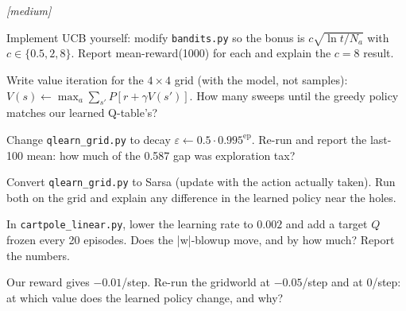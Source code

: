 \emph{[medium]}
\begin{exercise}
Implement UCB yourself: modify \texttt{bandits.py} so the bonus is
$c\sqrt{\ln t / N_a}$ with $c \in \{0.5, 2, 8\}$. Report
mean-reward(1000) for each and explain the $c{=}8$ result.
\end{exercise}
\begin{exercise}
Write value iteration for the $4\times4$ grid (with the model, not
samples): $V(s) \leftarrow \max_a \sum_{s'} P[r+\gamma V(s')]$.
How many sweeps until the greedy policy matches our learned Q-table's?
\end{exercise}
\begin{exercise}
Change \texttt{qlearn\_grid.py} to decay
$\varepsilon \leftarrow 0.5 \cdot 0.995^{\mathrm{ep}}$. Re-run and
report the last-100 mean: how much of the 0.587 gap was exploration
tax?
\end{exercise}
\begin{exercise}
Convert \texttt{qlearn\_grid.py} to Sarsa (update with the action
actually taken). Run both on the grid and explain any difference in
the learned policy near the holes.
\end{exercise}
\begin{exercise}
In \texttt{cartpole\_linear.py}, lower the learning rate to
$0.002$ and add a target $Q$ frozen every 20 episodes. Does the
|w|-blowup move, and by how much? Report the numbers.
\end{exercise}
\begin{exercise}
Our reward gives $-0.01$/step. Re-run the gridworld at $-0.05$/step
and at $0$/step: at which value does the learned policy change, and
why?
\end{exercise}

